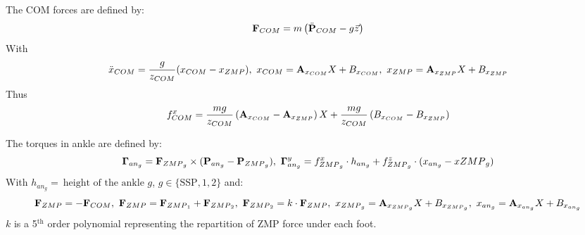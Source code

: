 \documentclass[journal]{IEEEtran}
\begin{document}
The COM forces are defined by:
\begin{equation}
\label{eq:fcom_algo}
\mathbf{F}_{\mbox{\tiny COM}}=m \left( \ddot{\textbf{P}}_{\mbox{\tiny COM}} - g\vec{z} \right)
\end{equation}
With
\begin{equation}
\label{eq:com_equation}
\ddot{x}_{\mbox{\tiny COM}}=\dfrac{g}{z_{\mbox{\tiny COM}}}(x_{\mbox{\tiny COM}}-x_{\mbox{\tiny ZMP}}), \ x_{\mbox{\tiny COM}}=\mathbf{A}_{x_{\mbox{\tiny COM}}} X + B_{x_{\mbox{\tiny COM}}}, \ x_{\mbox{\tiny ZMP}}=\mathbf{A}_{x_{\mbox{\tiny ZMP}}} X + B_{x_{\mbox{\tiny ZMP}}}
\end{equation}
Thus
\begin{equation}
\label{eq:com_forces}
f^{x}_{\mbox{\tiny COM}}=\dfrac{mg}{z_{\mbox{\tiny COM}}} \left(\mathbf{A}_{x_{\mbox{\tiny COM}}}- \mathbf{A}_{x_{\mbox{\tiny ZMP}}} \right) X+\dfrac{mg}{z_{\mbox{\tiny COM}}}\left(B_{x_{\mbox{\tiny COM}}}- B_{x_{\mbox{\tiny ZMP}}} \right)
\end{equation}

The torques in ankle are defined by:
\begin{equation}
\mathbf{\Gamma}_{an_g}=\mathbf{F}_{\mbox{\tiny ZMP}_g}\times (\textbf{P}_{an_g}-\textbf{P}_{\mbox{\tiny ZMP}_g}), \ \mathbf{\Gamma}^{y}_{an_g}=f^{x}_{\mbox{\tiny ZMP}_g}\cdot h_{an_g}+f^{z}_{\mbox{\tiny ZMP}_g}\cdot(x_{an_g}-x{\mbox{\tiny ZMP}_g})
\end{equation}
With $h_{an_g}= \ \mbox{height of the ankle $g$}\nonumber$, $g \in \lbrace \mbox{SSP},1,2 \rbrace$ and:
\begin{equation}
\mathbf{F}_{\mbox{\tiny ZMP}}=-\mathbf{F}_{\mbox{\tiny COM}}, \ \mathbf{F}_{\mbox{\tiny ZMP}}=\mathbf{F}_{\mbox{\tiny ZMP}_1}+\mathbf{F}_{\mbox{\tiny ZMP}_2}, \ \mathbf{F}_{\mbox{\tiny ZMP}_2}=k\cdot \mathbf{F}_{\mbox{\tiny ZMP}}, \ x_{\mbox{\tiny ZMP}_g}=\mathbf{A}_{x_{\mbox{\tiny ZMP}_g}} X + B_{x_{\mbox{\tiny ZMP}_g}}, \ x_{an_g}=\mathbf{A}_{x_{an_g}} X + B_{x_{an_g}}
\end{equation}
$k$ is a 5$^{\text{th}}$ order polynomial representing the repartition of ZMP force under each foot.
\end{document}
